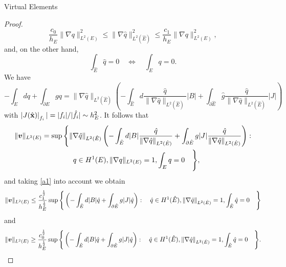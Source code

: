 \begin{chapter}{Virtual Elements}
\begin{proof}
\begin{equation}\label{a1}
\frac{c_0}{h_E}\|\nabla q\|_{L^2(E)}^2\le \|\nabla\hat q\|_{L^2(\hat E)}^2\le \frac{c_1}{h_E}\|\nabla q\|_{L^2(E)}^2,
\end{equation}
and, on the other hand,
\[
\int_{\hat E}\hat q =0\quad \Longleftrightarrow \quad\int_Eq=0.
\]
We have
\[
-\int_Edq + \int_{\partial E}gq = \|\nabla \hat q\|_{L^2(\hat E)}\left(-\int_{\hat E}d\frac{\hat q}{\|\nabla\hat q\|_{L^2(\hat E)}}|B| + \int_{\partial \hat E}\hat g\frac{\hat q}{\|\nabla\hat q\|_{L^2(\hat E)}} |J|\right)
\]
with $\left|J(\hat{\bf x})\right|_{f_i}|= |f_i|/|\hat f_i|\sim h_E^2$. It follows that
\begin{multline*}
\|\boldsymbol{v}\|_{L^2(E)}=\sup\Bigg\{\|\nabla \hat q\|_{L^2(\hat E)}\left(-\int_{\hat E}d|B|\frac{\hat q}{\|\nabla\hat q\|_{L^2(\hat E)}} + \int_{\partial \hat E}g|J|\frac{\hat q}{\|\nabla\hat q\|_{L^2(\hat E)}} \right):\\ \quad q\in H^1(E),\|\nabla q\|_{L^2(E)}=1,\int_Eq=0\quad\Bigg\},
\end{multline*}
and taking \eqref{a1} into account we obtain
\begin{equation}\label{mult1}
\|\boldsymbol{v}\|_{L^2(E)}\le  \frac{c_1^\frac12}{h_E^\frac12}\sup\Bigg\{\left(-\int_{\hat E}d|B|\hat q + \int_{\partial \hat E}g|J|\hat q \right): \quad \hat q\in H^1(\hat E),\|\nabla \hat q\|_{L^2(\hat E)}=1,\int_{\hat E}\hat q=0\quad\Bigg\}
\end{equation}
and 
\begin{equation}\label{mult2}
\|\boldsymbol{v}\|_{L^2(E)}\ge  \frac{c_0^\frac12}{h_E^\frac12}\sup\Bigg\{\left(-\int_{\hat E}d|B|\hat q + \int_{\partial \hat E}g|J|\hat q \right): \quad \hat q\in H^1(\hat E),\|\nabla \hat q\|_{L^2(\hat E)}=1,\int_{\hat E}\hat q=0\quad\Bigg\}.
\end{equation}

\end{proof}
\end{chapter}
